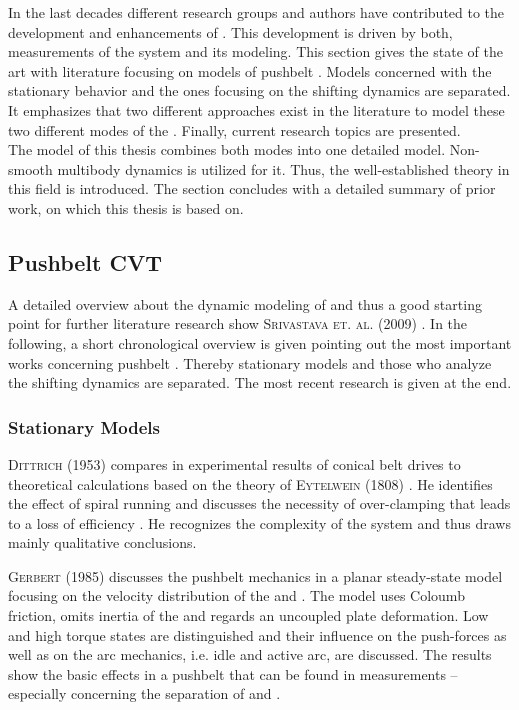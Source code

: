 In the last decades different research groups and authors have contributed to the development and enhancements of \CVTs.
This development is driven by both, measurements of the system and its modeling.
This section gives the state of the art with literature focusing on models of pushbelt \CVTs.
Models concerned with the stationary behavior and the ones focusing on the shifting dynamics are separated.
It emphasizes that two different approaches exist in the literature to model these two different modes of the \CVT.
Finally, current research topics are presented.\\
The model of this thesis combines both modes into one detailed model.
Non-smooth multibody dynamics is utilized for it.
Thus, the well-established theory in this field is introduced.
The section concludes with a detailed summary of prior work, on which this thesis is based on.

\subsection{Pushbelt CVT} \label{subsec:ThePushbeltCVT}

A detailed overview about the dynamic modeling of \CVTs and thus a good starting point for further literature research show \textsc{Srivastava et. al.} (2009) \cite{srivastava_review_2009}. 
In the following, a short chronological overview is given pointing out the most important works concerning pushbelt \CVTs.
Thereby stationary models and those who analyze the shifting dynamics are separated.
The most recent research is given at the end.

\subsubsection{Stationary Models}

\textsc{Dittrich} (1953) compares in \cite{dittrich_theorie_1953} experimental results of conical belt drives to theoretical calculations based on the theory of \textsc{Eytelwein} (1808) \cite{eytelwein_handbuch_1808}.
He identifies the effect of spiral running and discusses the necessity of over-clamping that leads to a loss of efficiency \cite{simonis_theorie_1959}. 
He recognizes the complexity of the system and thus draws mainly qualitative conclusions.

\textsc{Gerbert} (1985) discusses the pushbelt mechanics in a planar steady-state model focusing on the velocity distribution of the \els and \rings.
The model uses  Coloumb friction, omits inertia of the \els and regards an uncoupled plate deformation.
Low and high torque states are distinguished and their influence on the push-forces as well as on the arc mechanics, i.e. idle and active arc, are discussed.
The results show the basic effects in a pushbelt \CVT that can be found in measurements -- especially concerning the separation of \rings and \els. 

